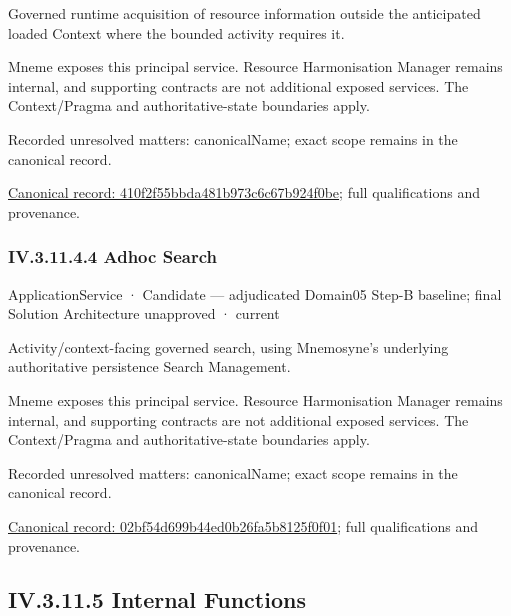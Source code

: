 Governed runtime acquisition of resource information outside the anticipated loaded Context where the bounded activity requires it.



Mneme exposes this principal service. Resource Harmonisation Manager remains internal, and supporting contracts are not additional exposed services. The Context/Pragma and authoritative-state boundaries apply.


{\small Recorded unresolved matters: canonicalName; exact scope remains in the canonical record.}\par
{\footnotesize \href{../../../../../../../continuum/application/application-service/410f2f55bbda481b973c6c67b924f0be.md}{Canonical record: 410f2f55bbda481b973c6c67b924f0be}; full qualifications and provenance.}\par
\subsubsection*{IV.3.11.4.4 Adhoc Search}
\label{navigation:IV.3.11.4.4}

\label{element:02bf54d699b44ed0b26fa5b8125f0f01}
{\small ApplicationService · Candidate — adjudicated Domain05 Step-B baseline; final Solution Architecture unapproved · current}\par

Activity/context-facing governed search, using Mnemosyne's underlying authoritative persistence Search Management.



Mneme exposes this principal service. Resource Harmonisation Manager remains internal, and supporting contracts are not additional exposed services. The Context/Pragma and authoritative-state boundaries apply.


{\small Recorded unresolved matters: canonicalName; exact scope remains in the canonical record.}\par
{\footnotesize \href{../../../../../../../continuum/application/application-service/02bf54d699b44ed0b26fa5b8125f0f01.md}{Canonical record: 02bf54d699b44ed0b26fa5b8125f0f01}; full qualifications and provenance.}\par
\subsection*{IV.3.11.5 Internal Functions}
\label{navigation:IV.3.11.5}

